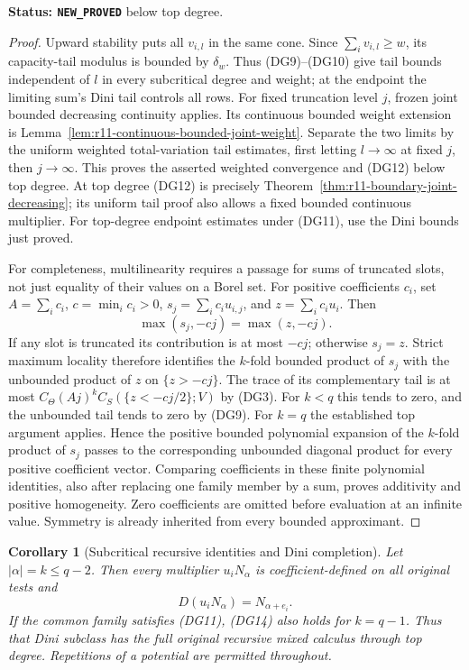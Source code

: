\documentclass[11pt,a4paper]{article}
\numberwithin{equation}{section}
\newtheorem{corollary}[theorem]{Corollary}
\theoremstyle{definition}
\theoremstyle{remark}
\begin{document}
\noindent\textbf{Status: \texttt{NEW\_PROVED}} below top degree.

\begin{proof}
Upward stability puts all $v_{i,l}$ in the same cone.
Since $\sum_i v_{i,l}\geq w$, its capacity-tail modulus is
bounded by $\delta_w$. Thus (DG9)--(DG10) give tail bounds
independent of $l$ in every subcritical degree and weight;
at the endpoint the limiting sum's Dini tail controls all rows.
For fixed truncation level $j$, frozen joint bounded decreasing
continuity applies. Its continuous bounded weight extension is
Lemma~\ref{lem:r11-continuous-bounded-joint-weight}.
Separate the two limits by the uniform weighted total-variation
tail estimates, first letting $l\to\infty$ at fixed $j$, then
$j\to\infty$. This proves the asserted weighted convergence and
(DG12) below top degree. At top degree (DG12) is precisely
Theorem~\ref{thm:r11-boundary-joint-decreasing}; its uniform
tail proof also allows a fixed bounded continuous multiplier.
For top-degree endpoint estimates under (DG11), use the Dini
bounds just proved.

For completeness, multilinearity requires a passage for sums
of truncated slots, not just equality of their values on a
Borel set. For positive coefficients $c_i$, set
$A=\sum_i c_i$, $c=\min_i c_i>0$,
$s_j=\sum_i c_i u_{i,j}$, and $z=\sum_i c_i u_i$.
Then
\[
                       \max(s_j,-cj)=\max(z,-cj).
 \tag{DG13}
\]
If any slot is truncated its contribution is at most $-cj$;
otherwise $s_j=z$. Strict maximum locality therefore identifies
the $k$-fold bounded product of $s_j$ with the unbounded product
of $z$ on $\{z>-cj\}$.
The trace of its complementary tail is at most
$C_\Theta(Aj)^k C_S(\{z<-cj/2\};V)$ by (DG3).
For $k<q$ this tends to zero, and the unbounded tail tends to
zero by (DG9). For $k=q$ the established top argument applies.
Hence the positive bounded polynomial expansion of the
$k$-fold product of $s_j$ passes to the corresponding unbounded
diagonal product for every positive coefficient vector.
Comparing coefficients in these finite polynomial identities,
also after replacing one family member by a sum, proves
additivity and positive homogeneity. Zero coefficients are
omitted before evaluation at an infinite value. Symmetry is
already inherited from every bounded approximant.
\end{proof}

\begin{corollary}[Subcritical recursive identities and Dini completion]
\label{cor:r11-boundary-recursion-dini}
Let $|\alpha|=k\leq q-2$. Then every multiplier $u_iN_\alpha$
is coefficient-defined on all original tests and
\[
                         D(u_iN_\alpha)=N_{\alpha+e_i}.
 \tag{DG14}
\]
If the common family satisfies (DG11), (DG14) also holds for
$k=q-1$. Thus that Dini subclass has the full original recursive
mixed calculus through top degree. Repetitions of a potential
are permitted throughout.
\end{corollary}
\end{document}
